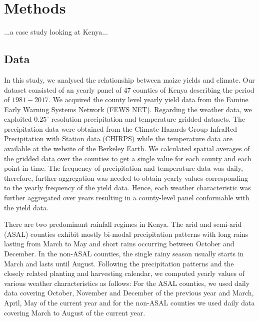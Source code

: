 \documentclass[12pt]{iopart}
\begin{document}
\section{Methods}\label{Methods}
\color{blue}

...a case study looking at Kenya...
\color{black}


 
\subsection{Data}\label{Data}

In this study, we analysed the relationship between maize yields and climate. Our dataset consisted of an yearly panel of $47$ counties of Kenya describing the period of $1981-2017$. 
	We acquired the county level yearly yield data from the Famine Early Warning Systems Network (FEWS NET). Regarding the weather data, we exploited $0.25^\circ$ resolution precipitation and temperature gridded datasets. The precipitation data were obtained from the Climate Hazards Group InfraRed Precipitation with Station data (CHIRPS) while the temperature data are available at the website of the Berkeley Earth. We calculated spatial averages of the gridded data over the counties to get a single value for each county and each point in time. The frequency of precipitation and temperature data was daily, therefore, further aggregation was needed to obtain yearly values corresponding to the yearly frequency of the yield data. Hence, each weather characteristic was further aggregated over years resulting in a county-level panel conformable with the yield data. 
	
	There are two predominant rainfall regimes in Kenya. The arid and semi-arid (ASAL) counties exhibit mostly bi-modal precipitation patterns with long rains lasting from March to May and short rains occurring between October and December. In the non-ASAL counties, the single rainy season usually starts in March and lasts until August. Following the precipitation patterns and the closely related planting and harvesting calendar, we computed yearly values of various weather characteristics as follows: For the ASAL counties, we used daily data covering October, November and December of the previous year and March, April, May of the current year and for the non-ASAL counties we used daily data covering March to August of the current year.
\end{document}
